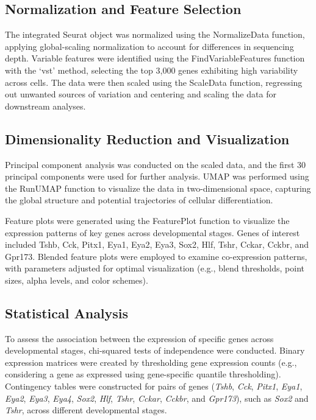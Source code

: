 \documentclass[
  number,
  preprint]{elsarticle}
\begin{document}
\subsection{Normalization and Feature
Selection}\label{normalization-and-feature-selection}

The integrated Seurat object was normalized using the NormalizeData
function, applying global-scaling normalization to account for
differences in sequencing depth. Variable features were identified using
the FindVariableFeatures function with the `vst'
method\citep{hafemeister2019}, selecting the top 3,000 genes exhibiting
high variability across cells. The data were then scaled using the
ScaleData function, regressing out unwanted sources of variation and
centering and scaling the data for downstream analyses.

\subsection{Dimensionality Reduction and
Visualization}\label{dimensionality-reduction-and-visualization}

Principal component analysis was conducted on the scaled data, and the
first 30 principal components were used for further analysis. UMAP was
performed using the RunUMAP function to visualize the data in
two-dimensional space, capturing the global structure and potential
trajectories of cellular differentiation.

Feature plots were generated using the FeaturePlot function to visualize
the expression patterns of key genes across developmental stages. Genes
of interest included Tshb, Cck, Pitx1, Eya1, Eya2, Eya3, Sox2, Hlf,
Tshr, Cckar, Cckbr, and Gpr173. Blended feature plots were employed to
examine co-expression patterns, with parameters adjusted for optimal
visualization (e.g., blend thresholds, point sizes, alpha levels, and
color schemes).

\subsection{Statistical Analysis}\label{statistical-analysis}

To assess the association between the expression of specific genes
across developmental stages, chi-squared tests of independence were
conducted. Binary expression matrices were created by thresholding gene
expression counts (e.g., considering a gene as expressed using
gene-specific quantile thresholding). Contingency tables were
constructed for pairs of genes (\emph{Tshb}, \emph{Cck}, \emph{Pitx1},
\emph{Eya1}, \emph{Eya2}, \emph{Eya3}, \emph{Eya4}, \emph{Sox2},
\emph{Hlf}, \emph{Tshr}, \emph{Cckar}, \emph{Cckbr}, and \emph{Gpr173}),
such as \emph{Sox2} and \emph{Tshr}, across different developmental
stages.
\end{document}
